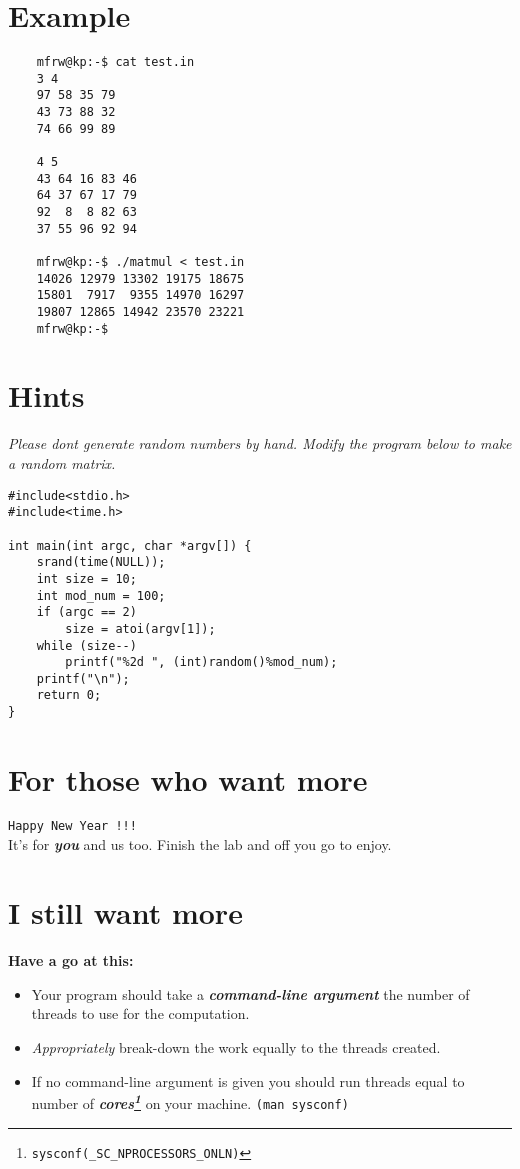 \documentclass{article}
\begin{document}
\section{Example}
\begin{verbatim}
	mfrw@kp:-$ cat test.in
	3 4
	97 58 35 79
	43 73 88 32
	74 66 99 89

	4 5
	43 64 16 83 46
	64 37 67 17 79
	92  8  8 82 63
	37 55 96 92 94

	mfrw@kp:-$ ./matmul < test.in
	14026 12979 13302 19175 18675
	15801  7917  9355 14970 16297
	19807 12865 14942 23570 23221
	mfrw@kp:-$ 
\end{verbatim}
\newpage
\section{Hints}
\em{Please dont generate random numbers by hand. Modify the program below to make a random matrix.} \em
\begin{verbatim}
#include<stdio.h>
#include<time.h>

int main(int argc, char *argv[]) {
    srand(time(NULL));
    int size = 10;
    int mod_num = 100;
    if (argc == 2)
        size = atoi(argv[1]);
    while (size--)
        printf("%2d ", (int)random()%mod_num);
    printf("\n");
    return 0;
}

\end{verbatim}
\section{For those who want more}
\texttt{Happy New Year !!!} \\
It's for \textit{\textbf{you}} and us too. Finish the lab and off you go to enjoy.
\section{I still want more}
\textbf{Have a go at this:}
\begin{itemize}
	\item Your program should take a \textit{\textbf{command-line argument}} the number of threads to use for the computation.
	\item \textit{Appropriately} break-down the work equally to the threads created.
	\item If no command-line argument is given you should run threads equal to number of \textit{\textbf{cores\footnote[2]{\texttt{sysconf(\_SC\_NPROCESSORS\_ONLN)}}}} on your machine. \texttt{(man sysconf)}
\end{itemize}
\end{document}
